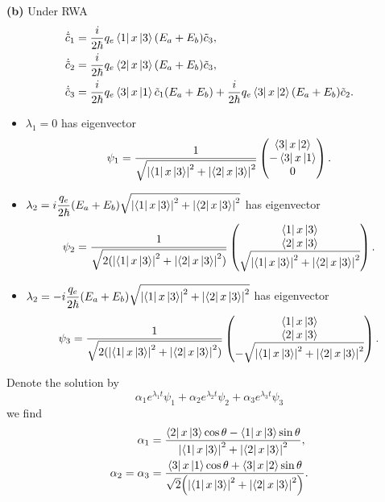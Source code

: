 \documentclass{article}
\makeatletter
\newcommand*{\shifttext}[1]{%
  \settowidth{\@tempdima}{#1}%
  \hspace{-\@tempdima}#1%
}
\newcommand{\plabel}[1]{%
\shifttext{\textbf{#1}\quad}%
}
\makeatother
\begin{document}
\plabel{(b)}%
Under RWA
\begin{align*}
    \dot{\tilde{c}}_1 &= \frac{i}{2 \hbar} q_e \bra{1} x \ket{3} (E_a + E_b) \tilde{c}_3, \\
    \dot{\tilde{c}}_2 &= \frac{i}{2 \hbar} q_e \bra{2} x \ket{3} (E_a + E_b) \tilde{c}_3, \\
    \dot{\tilde{c}}_3 &= \frac{i}{2 \hbar} q_e \bra{3} x \ket{1} \tilde{c}_1 (E_a+E_b) + \frac{i}{2 \hbar} q_e \bra{3} x \ket{2} (E_a + E_b) \tilde{c}_2.
\end{align*}
\begin{itemize}
    \item $\lambda_1 = 0$ has eigenvector
    \[ \psi_1 = \frac{1}{\sqrt{\abs{\bra{1} x \ket{3}}^2 + \abs{\bra{2} x \ket{3}}^2}} \begin{pmatrix}
        \bra{3} x \ket{2} \\
        -\bra{3} x \ket{1} \\
        0
    \end{pmatrix}. \]
    \item $\displaystyle \lambda_2 = i\frac{q_e}{2\hbar} (E_a + E_b) \sqrt{\abs{\bra{1} x \ket{3}}^2 + \abs{\bra{2} x \ket{3}}^2}$ has eigenvector
    \[ \psi_2 = \frac{1}{\sqrt{2(\abs{\bra{1} x \ket{3}}^2 + \abs{\bra{2} x \ket{3}}^2)}} \begin{pmatrix}
        \bra{1} x \ket{3} \\ \bra{2} x \ket{3} \\ \sqrt{\abs{\bra{1} x \ket{3}}^2 + \abs{\bra{2} x \ket{3}}^2}
    \end{pmatrix}. \]
    \item $\displaystyle \lambda_2 = -i\frac{q_e}{2\hbar} (E_a + E_b) \sqrt{\abs{\bra{1} x \ket{3}}^2 + \abs{\bra{2} x \ket{3}}^2}$ has eigenvector
    \[ \psi_3 = \frac{1}{\sqrt{2(\abs{\bra{1} x \ket{3}}^2 + \abs{\bra{2} x \ket{3}}^2)}} \begin{pmatrix}
        \bra{1} x \ket{3} \\ \bra{2} x \ket{3} \\ -\sqrt{\abs{\bra{1} x \ket{3}}^2 + \abs{\bra{2} x \ket{3}}^2}
    \end{pmatrix}. \]
\end{itemize}
Denote the solution by
\[ \alpha_1 e^{\lambda_1 t} \psi_1 + \alpha_2 e^{\lambda_2 t} \psi_2 + \alpha_3 e^{\lambda_3 t} \psi_3 \]
we find
\begin{align*}
    \alpha_1 &= \frac{\bra{2} x \ket{3} \cos\theta - \bra{1} x \ket{3} \sin\theta}{{\abs{\bra{1} x \ket{3}}^2 + \abs{\bra{2} x \ket{3}}^2}}, \\
    \alpha_2 = \alpha_3 &= \frac{\bra{3} x \ket{1} \cos\theta + \bra{3} x \ket{2} \sin\theta}{\sqrt{2} \qty({\abs{\bra{1} x \ket{3}}^2 + \abs{\bra{2} x \ket{3}}^2})}.
\end{align*}
\end{document}
